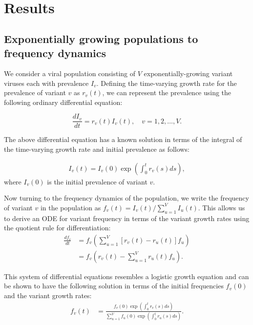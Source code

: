 \documentclass[12pt,oneside,letterpaper]{article}
\begin{document}
\section*{Results}

\subsection*{Exponentially growing populations to frequency dynamics}%

We consider a viral population consisting of $V$ exponentially-growing variant viruses each with prevalence $I_{v}$.
Defining the time-varying growth rate for the prevalence of variant $v$ as $r_{v}(t)$, we can represent the prevalence using the following ordinary differential equation:

\begin{equation} \label{eq:inhomo_exp_growth}
    \frac{d I_{v}}{d t} = r_{v}(t) I_{v}(t), \quad v = 1,2, \ldots, V.
\end{equation}

The above differential equation has a known solution in terms of the integral of the time-varying growth rate and initial prevalence as follows:

\begin{align*}
I_{v}(t) = I_{v}(0) \exp\left( \int_{0}^{t} r_{v}(s) ds\right),
\end{align*}
where $I_{v}(0)$ is the initial prevalence of variant $v$.

Now turning to the frequency dynamics of the population, we write the frequency of variant $v$ in the population as  $f_{v}(t) = I_{v}(t) / \sum_{u=1}^{V} I_{u}(t)$.
This allows us to derive an ODE for variant frequency in terms of the variant growth rates using the quotient rule for differentiation:
\begin{align*}
    \frac{d f_{v}}{d t} &= f_{v} \left( \sum_{u=1}^{V} [r_{v}(t) - r_{u}(t)] f_{u} \right)\\
                        &= f_{v} \left( r_{v}(t) - \sum_{u=1}^{V} r_{u}(t) f_{u} \right).
\end{align*}

This system of differential equations resembles a logistic growth equation and can be shown to have the following solution in terms of the initial frequencies $f_{v}(0)$ and the variant growth rates:
\begin{align}
    f_{v}(t) &= \frac{ f_{v}(0) \exp( \int_{0}^{t} r_{v}(s) ds)}{\sum_{u=1}^{V}  f_{u}(0) \exp( \int_{0}^{t} r_{u}(s) ds)}.
\end{align}
\end{document}
